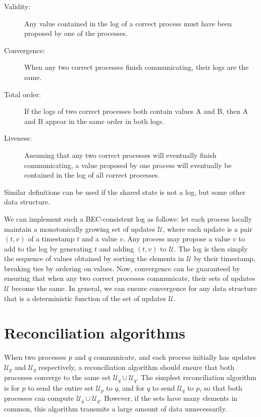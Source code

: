 \documentclass[manuscript,anonymous]{acmart}
\begin{document}
\begin{description}
\item[Validity:] Any value contained in the log of a correct process must have been proposed by one of the processes.
\item[Convergence:] When any two correct processes finish communicating, their logs are the same.
\item[Total order:] If the logs of two correct processes both contain values A and B, then A and B appear in the same order in both logs.
\item[Liveness:] Assuming that any two correct processes will eventually finish communicating, a value proposed by one process will eventually be contained in the log of all correct processes.
\end{description}

Similar definitions can be used if the shared state is not a log, but some other data structure.


We can implement such a BEC-consistent log as follows: let each process locally maintain a monotonically growing set of updates $\mathcal{U}$, where each update is a pair $(t, v)$ of a timestamp $t$ and a value $v$.
Any process may propose a value $v$ to add to the log by generating $t$ and adding $(t, v)$ to $\mathcal{U}$.
The log is then simply the sequence of values obtained by sorting the elements in $\mathcal{U}$ by their timestamp, breaking ties by ordering on values.
Now, convergence can be guaranteed by ensuring that when any two correct processes communicate, their sets of updates $\mathcal{U}$ become the same.
In general, we can ensure convergence for any data structure that is a deterministic function of the set of updates $\mathcal{U}$.

\section{Reconciliation algorithms}\label{sec:algorithm}

When two processes $p$ and $q$ communicate, and each process initially has updates $\mathcal{U}_p$ and $\mathcal{U}_q$ respectively, a reconciliation algorithm should ensure that both processes converge to the same set $\mathcal{U}_q \cup \mathcal{U}_q$.
The simplest reconciliation algorithm is for $p$ to send the entire set $\mathcal{U}_p$ to $q$, and for $q$ to send $\mathcal{U}_q$ to $p$, so that both processes can compute $\mathcal{U}_q \cup \mathcal{U}_q$.
However, if the sets have many elements in common, this algorithm transmits a large amount of data unnecessarily.
\end{document}
